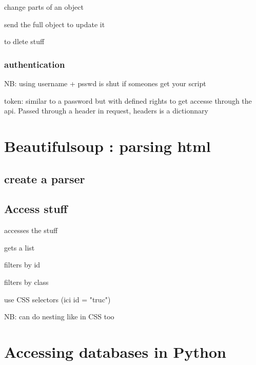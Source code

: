 			 change parts of an object

			 send the full object to update it

			 to dlete stuff

		\subsubsection{authentication}
			
			NB: using username + psswd is shut if someones get your script

			token: similar to a password but with defined rights to get accesse through the api. Passed through a header in request, headers is a dictionnary
			



\section{Beautifulsoup : parsing html}

	\subsection{create a parser}
		


	\subsection{Access stuff}

		 accesses the stuff

		 gets a list

		 filters by id

		 filters by class

		 use CSS selectors (ici id = "truc")

		NB: can do nesting like in CSS too



\section{Accessing databases in Python}

